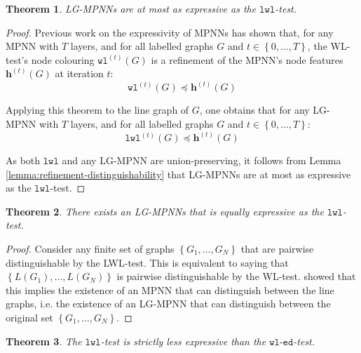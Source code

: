 \documentclass{article}
\newtheorem{theorem}{Theorem}
\newcommand{\set}[1]{\left\{#1\right\}}
\newcommand{\iter}[1]{^{(#1)}}
\newcommand{\wl}{\texttt{wl}}
\newcommand{\wledge}{\texttt{wl-ed}}
\newcommand{\lwl}{\texttt{lwl}}
\newcommand{\bs}[1]{\boldsymbol{#1}}
\newcommand{\feat}{\bs{h}}
\begin{document}
\begin{theorem} \label{thm:lg-mpnn-less-than-lwl}
    LG-MPNNs are at most as expressive as the $\lwl$-test. 
\end{theorem}
\begin{proof}
    Previous work on the expressivity of MPNNs \cite{morris2019weisfeiler} has shown that, for any MPNN with $T$ layers, and for all labelled graphs $G$ and $t\in\set{0,\dots,T}$, the WL-test's node colouring $\wl\iter{t}(G)$ is a refinement of the MPNN's node features $\feat\iter{t}(G)$ at iteration $t$:
    \begin{equation}
        \wl\iter{t}(G) \preceq \feat\iter{t}(G)
    \end{equation}

    Applying this theorem to the line graph of $G$, one obtains that for any LG-MPNN with $T$ layers, and for all labelled graphs $G$ and $t\in\set{0,\dots,T}$:
    \begin{equation}    \label{eq:lwl-refinement-of-lg-mpnn}
        \lwl\iter{t}(G) \preceq \feat\iter{t}(G)
    \end{equation}

    As both $\lwl$ and any LG-MPNN are union-preserving, it follows from Lemma \ref{lemma:refinement-distinguishability} that LG-MPNNs are at most as expressive as the $\lwl$-test.
\end{proof}

\begin{theorem} \label{thm:lg-mpnn-equal-to-lwl}
    There exists an LG-MPNNs that is equally expressive as the $\lwl$-test.
\end{theorem}
\begin{proof}
    Consider any finite set of graphs $\set{G_1, \dots, G_N}$ that are pairwise distinguishable by the LWL-test. This is equivalent to saying that $\set{L(G_1), \dots, L(G_N)}$ is pairwise distinguishable by the WL-test. \cite{xu2018powerful} showed that this implies the existence of an MPNN that can distinguish between the line graphs, i.e. the existence of an LG-MPNN that can distinguish between the original set $\set{G_1, \dots, G_N}$.
\end{proof}

\begin{theorem} \label{thm:lwl-less-than-wledge}
    The $\lwl$-test is strictly less expressive than the $\wledge$-test.
\end{theorem}
\newlength{\WLOGarrowwidth}
\newcommand{\RightarrowAsWideAsWLOGArrow}{\makebox[\WLOGarrowwidth][c]{$\Rightarrow$}}
\end{document}
